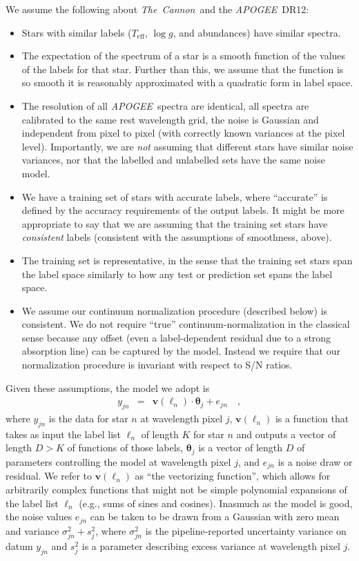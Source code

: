\documentclass[12pt,preprint]{aastex}
\newcommand{\project}[1]{\textsl{#1}}
\newcommand{\TheCannon}{\project{The~Cannon}}
\newcommand{\acronym}[1]{{\small{#1}}}
\newcommand{\apogee}{\project{\acronym{APOGEE}}}
\newcommand{\dr}{\acronym{DR12}}
\newcommand{\logg}{\log g}
\newcommand{\Teff}{T_{\mathrm{eff}}}
\newcommand{\Dvector}[1]{\boldsymbol{#1}}
\newcommand{\vectheta}{\Dvector{\theta}}
\newcommand{\vecv}{\Dvector{v}}
\begin{document}
\noindent{}We assume the following about \TheCannon\ and the \apogee\ \dr:
\begin{itemize}
\item
Stars with similar labels ($\Teff$, $\logg$, and abundances) have similar spectra.
\item
The expectation of the spectrum of a star is a smooth function of the values of 
the labels for that star.  Further than this, we assume that the function is so 
smooth it is reasonably approximated with a quadratic form in label space.
\item
The resolution of all \apogee\ spectra are identical, all spectra are calibrated
to the same rest wavelength grid, the noise is Gaussian and independent from 
pixel to pixel (with correctly known variances at the pixel level).  
Importantly, we are \emph{not} assuming that different stars have similar noise
variances, nor that the labelled and unlabelled sets have the same noise model.
\item
We have a training set of stars with accurate labels, where ``accurate'' is 
defined by the accuracy requirements of the output labels.  It might be more 
appropriate to say that we are assuming that the training set stars have 
\emph{consistent} labels (consistent with the assumptions of smoothness, above).
\item
The training set is representative, in the sense that the training set stars 
span the label space similarly to how any test or prediction set spans the label
space.
\item
We assume our continuum normalization procedure (described below) is consistent.
We do not require ``true'' continuum-normalization in the classical sense 
because any offset (even a label-dependent residual due to a strong absorption
line) can be captured by the model.  Instead we require that our normalization
procedure is invariant with respect to S/N ratios.
\end{itemize}


\noindent{}Given these assumptions, the model we adopt is
\begin{eqnarray}
  y_{jn} &=& \vecv(\ell_n)\cdot\vectheta_j + e_{jn}
  \label{eq:model}\quad ,
\end{eqnarray}
where $y_{jn}$ is the data for star $n$ at wavelength pixel $j$, $\vecv(\ell_n)$
is a function that takes as input the label list $\ell_n$ of length $K$ for star
$n$ and outputs a vector of length $D>K$ of functions of those labels,
$\vectheta_j$ is a vector of length $D$ of parameters controlling the model at 
wavelength pixel $j$, and $e_{jn}$ is a noise draw or residual.  We refer to 
$\vecv(\ell_n)$ as ``the vectorizing function'', which allows for arbitrarily 
complex functions that might not be simple polynomial expansions of the label 
list $\ell_n$ (e.g., sums of sines and cosines).  Inasmuch as the model is good,
the noise values $e_{jn}$ can be taken to be drawn from a Gaussian with zero 
mean and variance $\sigma^2_{jn}+s^2_j$, where $\sigma^2_{jn}$ is the 
pipeline-reported uncertainty variance on datum $y_{jn}$ and $s^2_j$ is a 
parameter describing excess variance at wavelength pixel $j$.
\end{document}
